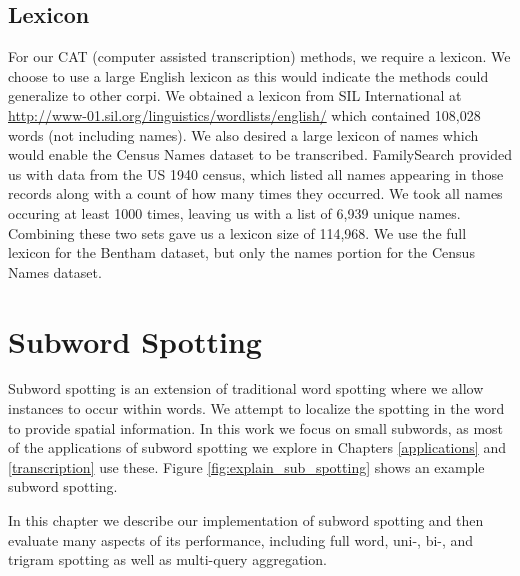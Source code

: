 \documentclass[ms,electronic,twosidetoc,letterpaper,chaptercenter,parttop,lof,lot]{byumsphd}
\begin{document}
\section{Lexicon}

For our CAT (computer assisted transcription) methods, we require a lexicon. We choose to use a large English lexicon as this would indicate the methods could generalize to other corpi. We obtained a lexicon from SIL International at \url{http://www-01.sil.org/linguistics/wordlists/english/} which contained 108,028 words (not including names). We also desired a large lexicon of names which would enable the Census Names dataset to be transcribed. FamilySearch provided us with data from the US 1940 census, which listed all names appearing in those records along with a count of how many times they occurred. We took all names occuring at least 1000 times, leaving us with a list of 6,939 unique names. Combining these two sets gave us a lexicon size of 114,968. We use the full lexicon for the Bentham dataset, but only the names portion for the Census Names dataset.

\chapter{Subword Spotting}\label{subwordspotting}

Subword spotting is an extension of traditional word spotting where we allow instances to occur within words. We attempt to localize the spotting in the word to provide spatial information. In this work we focus on small subwords, as most of the applications of subword spotting we explore in Chapters \ref{applications} and \ref{transcription} use these. Figure \ref{fig:explain_sub_spotting} shows an example subword spotting.

In this chapter we describe our implementation of subword spotting and then evaluate many aspects of its performance, including full word, uni-, bi-, and trigram spotting as well as multi-query aggregation.
\end{document}

